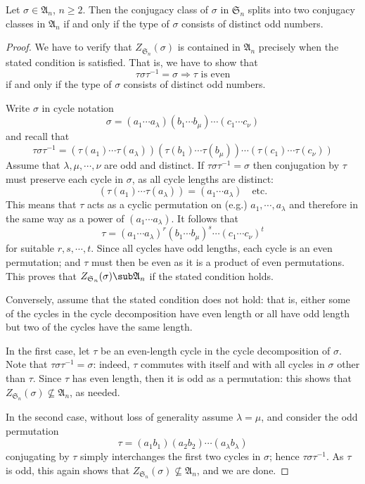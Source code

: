 \begin{proposition}\label{conjugate in A_n type}
Let $\sigma\in\mathfrak{A}_n$, $n\geq2$. Then the conjugacy class of $\sigma$ in $\mathfrak{S}_n$ splits into two conjugacy classes in $\mathfrak{A}_n$ if and only if the type of $\sigma$ consists of distinct odd numbers.
\end{proposition}
\begin{proof}
We have to verify that $Z_{\mathfrak{S}_n}(\sigma)$ is contained in $\mathfrak{A}_n$ precisely when the stated condition is satisfied. That is, we have to show that
\[\tau\sigma\tau^{-1}=\sigma\Rightarrow \tau\text{ is even}\]
if and only if the type of $\sigma$ consists of distinct odd numbers.\par
Write $\sigma$ in cycle notation
\[\sigma=(a_1\cdots a_\lambda)(b_1\cdots b_\mu)\cdots(c_1\cdots c_\nu)\]
and recall that
\[\tau\sigma\tau^{-1}=(\tau(a_1)\cdots\tau(a_\lambda))(\tau(b_1)\cdots \tau(b_\mu))\cdots(\tau(c_1)\cdots\tau(c_\nu))\]
Assume that $\lambda,\mu,\cdots,\nu$ are odd and distinct. If $\tau\sigma\tau^{-1}=\sigma$ then conjugation by $\tau$ must preserve each cycle in $\sigma$, as all cycle lengths are distinct:
\[(\tau(a_1)\cdots\tau(a_\lambda))=(a_1\cdots a_\lambda)\quad\text{etc.}\]
This means that $\tau$ acts as a cyclic permutation on (e.g.) $a_1,\cdots,a_\lambda$ and therefore in the same way as a power of $(a_1\cdots a_\lambda)$. It follows that
\[\tau=(a_1\cdots a_\lambda)^r(b_1\cdots b_\mu)^s\cdots(c_1\cdots c_\nu)^t\]
for suitable $r,s,\cdots,t$. Since all cycles have odd lengths, each cycle is an even permutation; and $\tau$ must then be even as it is a product of even permutations. This proves that $Z_{\mathfrak{S}_n}(\sigma)\sub\mathfrak{A}_n$ if the stated condition holds.\par
Conversely, assume that the stated condition does not hold: that is, either some of the cycles in the cycle decomposition have even length or all have odd length but two of the cycles have the same length.\par
In the first case, let $\tau$ be an even-length cycle in the cycle decomposition of $\sigma$. Note that $\tau\sigma\tau^{-1}=\sigma$: indeed, $\tau$ commutes with itself and with all cycles in $\sigma$ other than $\tau$. Since $\tau$ has even length, then it is odd as a permutation: this shows that $Z_{\mathfrak{S}_n}(\sigma)\nsubseteq\mathfrak{A}_n$, as needed.\par
In the second case, without loss of generality assume $\lambda=\mu$, and consider the odd permutation
\[\tau=(a_1b_1)(a_2b_2)\cdots(a_\lambda b_\lambda)\]
conjugating by $\tau$ simply interchanges the first two cycles in $\sigma$; hence $\tau\sigma\tau^{-1}$. As $\tau$ is odd, this again shows that $Z_{\mathfrak{S}_n}(\sigma)\nsubseteq\mathfrak{A}_n$, and we are done.
\end{proof}
